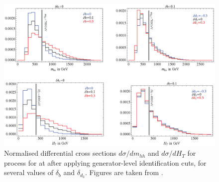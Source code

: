 \begin{figure}[htbp]
\centering
\includegraphics[width=1\textwidth]{theory/MhhHtDistribution}
\caption[]
{Normalised differential cross sections $d\sigma/dm_{hh}$ and $d\sigma/dH_{T}$ for  process for \CLIC at  after applying generator-level identification cuts,  for several values of $\delta_{b}$ and $\delta_{d_3}$. Figures are taken from \cite{Contino:2013gna}.}
\label{fig:theoryMhhHtDistribution}
\end{figure}

